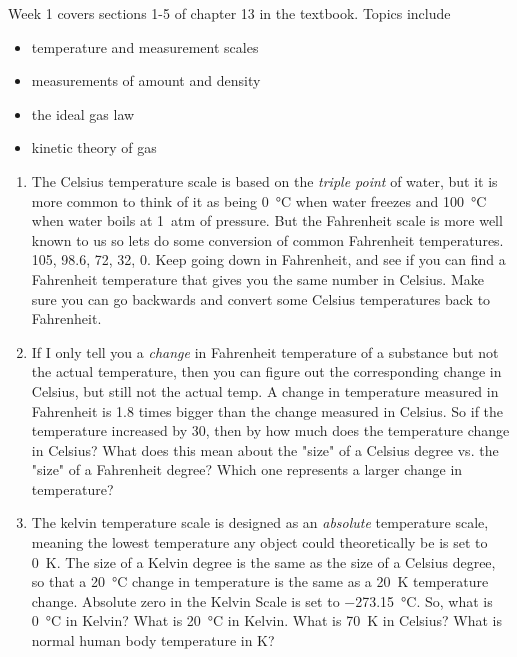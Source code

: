 Week 1 covers sections 1-5 of chapter 13 in the textbook. Topics include
\begin{itemize}
	\item temperature and measurement scales
	\item measurements of amount and density
	\item the ideal gas law
	\item kinetic theory of gas 
\end{itemize}


\begin{enumerate}
\setlength\itemsep{2 in}

\item
The Celsius temperature scale is based on the \emph{triple point} of water, but it is more common to think of it as being \qty{0}{\celsius} when water freezes and \qty{100}{\celsius} when water boils at \qty{1}{atm} of pressure. But the Fahrenheit scale is more well known to us so lets do some conversion of common Fahrenheit temperatures. \qty{105}{\fahrenheit}, \qty{98.6}{\fahrenheit}, \qty{72}{\fahrenheit}, \qty{32}{\fahrenheit}, \qty{0}{\fahrenheit}. Keep going down in Fahrenheit, and see if you can find a Fahrenheit temperature that gives you  the same number in Celsius. Make sure you can go backwards and convert some Celsius temperatures back to Fahrenheit.


\item
If I only tell you a \emph{change} in Fahrenheit temperature of a substance but not the actual temperature, then you can figure out the corresponding change in Celsius, but still not the actual temp. A change in temperature measured in Fahrenheit is 1.8 times bigger than the change measured in Celsius. So if the temperature increased by \SI{30}{\fahrenheit}, then by how much does the temperature change in Celsius? What does this mean about the "size" of a Celsius degree vs. the "size" of a Fahrenheit degree? Which one represents a larger change in temperature?

\item
The kelvin temperature scale is designed as an \emph{absolute} temperature scale, meaning the lowest temperature any object could theoretically be is set to \SI{0}{\kelvin}. The size of a Kelvin degree is the same as the size of a Celsius degree, so that a \SI{20}{\celsius} change in temperature is the same as a \SI{20}{\kelvin} temperature change. Absolute zero in the Kelvin Scale is set to \SI{-273.15}{\celsius}. So, what is \SI{0}{\celsius} in Kelvin? What is \SI{20}{\celsius} in Kelvin. What is \SI{70}{\kelvin} in Celsius? What is normal human body temperature in K?


\end{enumerate}
